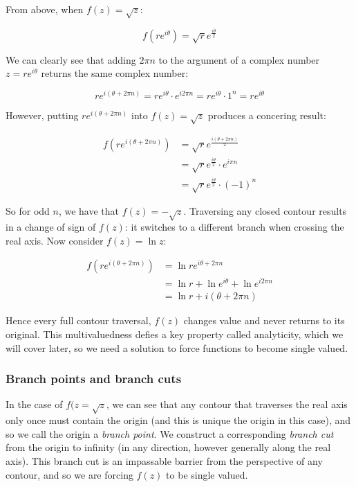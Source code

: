 \documentclass{../../physics_notes}
\begin{document}
From above, when $f(z) = \sqrt{z}$:

\begin{equation*}
f(re^{i\theta}) = \sqrt{r} e^{\frac{i\theta}{2}}
\end{equation*}

We can clearly see that adding $2\pi n$ to the argument of a complex number $z = re^{i\theta}$ returns the same complex number:

\[re^{i(\theta + 2\pi n)} = re^{i\theta}\cdot e^{i 2\pi n} = re^{i\theta}\cdot 1^n = re^{i\theta} \]

However, putting $re^{i(\theta + 2\pi n)}$ into $f(z) = \sqrt{z}$ produces a concering result:

\begin{align*}
f(re^{i(\theta + 2\pi n)}) &= \sqrt{r} e^{\frac{i(\theta + 2\pi n)}{2}} \\
&= \sqrt{r} e^{\frac{i\theta}{2}}\cdot e^{i \pi n} \\
&= \sqrt{r} e^{\frac{i\theta}{2}}\cdot (-1)^n 
\end{align*}

So for odd $n$, we have that $f(z) = -\sqrt{z}$. Traversing any closed contour results in a change of sign of $f(z)$: it switches to a different branch when crossing the real axis. Now consider $f(z) = \ln{z}$:

\begin{align*}
f(re^{i(\theta + 2\pi n)}) &= \ln{re^{i\theta + 2\pi n}} \\
&= \ln{r} + \ln{e^{i\theta}} + \ln{e^{i 2\pi n}} \\
&= \ln{r} + i(\theta + 2\pi n)
\end{align*}

Hence every full contour traversal, $f(z)$ changes value and never returns to its original. This multivaluedness defies a key property called analyticity, which we will cover later, so we need a solution to force functions to become single valued. 

\subsubsection*{Branch points and branch cuts }

In the case of $f(z = \sqrt{z}$, we can see that any contour that traverses the real axis only once must contain the origin (and this is unique the origin in this case), and so  we call the origin a \emph{branch point}. We construct a corresponding \emph{branch cut} from the origin to infinity (in any direction, however generally along the real axis). This branch cut is an impassable barrier from the perspective of any contour, and so we are forcing $f(z)$ to be single valued. 
\end{document}
